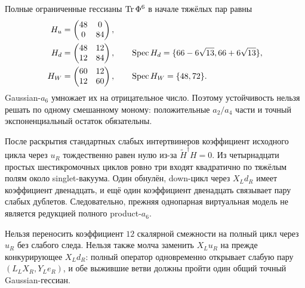 Полные ограниченные гессианы $\operatorname{Tr}\Phi^6$ в начале тяжёлых пар равны
\begin{align}
 H_u&=\begin{pmatrix}48&0\\0&84\end{pmatrix},\nonumber\\
 H_d&=\begin{pmatrix}48&12\\12&84\end{pmatrix},\qquad
 \operatorname{Spec} H_d=\{66-6\sqrt{13},66+6\sqrt{13}\},\nonumber\\
 H_W&=\begin{pmatrix}60&12\\12&60\end{pmatrix},\qquad
 \operatorname{Spec} H_W=\{48,72\}.
 \label{eq:v7-full-a6-heavy-hessians}
\end{align}
Gaussian-$a_6$ умножает их на отрицательное число. Поэтому устойчивость
нельзя решать по одному смешанному моному: положительные $a_2/a_4$ части и
точный экспоненциальный остаток обязательны.

\begin{theorem}
После раскрытия стандартных слабых интертвинеров коэффициент исходного
цикла через $u_R$ тождественно равен нулю из-за
$\widetilde H^\dagger H=0$. Из четырнадцати простых шестикромочных циклов
ровно три входят квадратично по тяжёлым полям около singlet-вакуума. Один
обнулён, down-цикл через $X_Ld_R$ имеет коэффициент двенадцать, и ещё один
коэффициент двенадцать связывает пару слабых дублетов. Следовательно,
прежняя однопарная виртуальная модель не является редукцией полного
product-$a_6$.
\end{theorem}

\begin{nogocriterion}
Нельзя переносить коэффициент $12$ скалярной смежности на полный цикл через
$u_R$ без слабого следа. Нельзя также молча заменить $X_Lu_R$ на прежде
конкурирующее $X_Ld_R$: полный оператор одновременно открывает слабую пару
$(L_LX_R,Y_Le_R)$, и обе выжившие ветви должны пройти один общий точный
Gaussian-гессиан.
\end{nogocriterion}

